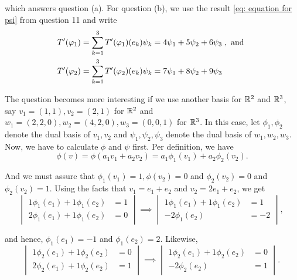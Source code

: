 \begin{xrcs}
\begin{xsol}
    which answers question (a). For question (b), we use the result \eqref{eq: equation for psi} from question 11 and write
    \begin{equation}
      \begin{aligned}
        &\displaystyle T' (\varphi_1) =  \sum_{k=1}^{3} \displaystyle T' (\varphi_1) (e_k) \psi_k = 4 \psi_1 + 5 \psi_2 + 6 \psi_3 \; , \text{ and }  \\
        &\displaystyle T' (\varphi_2) =  \sum_{k=1}^{3} \displaystyle T' (\varphi_2) (e_k) \psi_k = 7 \psi_1 + 8 \psi_2 + 9 \psi_3 \;
      \end{aligned}
    \end{equation}


     The question becomes more interesting if we use another basis for $\mathbb{R}^2$ and $\mathbb{R}^3$, say $v_1 = (1,1), v_2=(2,1)$ for $\mathbb{R}^2$ and $w_1 = (2,2,0), w_2 = (4,2,0), w_3 = (0,0,1)$ for $\mathbb{R}^3$. In this case, let $\phi_1, \phi_2$ denote the dual basis of $v_1, v_2$ and $\psi_1, \psi_2, \psi_3$ denote the dual basis of $w_1, w_2, w_3$. Now, we have to calculate $\phi$ and $\psi$ first. Per definition, we have
    \begin{equation}
      \phi(v) = \phi (a_1 v_1 + a_2 v_2) = a_1 \phi_1 (v_1) + a_2 \phi_2 (v_2).
    \end{equation}

    And we must assure that $\phi_1(v_1)=1, \phi(v_2)=0$ and $\phi_2(v_2)=0$ and $\phi_2(v_2) = 1$. Using the facts that $v_1 = e_1 + e_2$ and $v_2 = 2 e_1 + e_2$, we get
    \begin{equation}
      \left | \;
      \begin{aligned}
        1 \phi_1 (e_1) + 1 \phi_1 (e_2) &= 1 \\
        2 \phi_1 (e_1) + 1 \phi_1 (e_2) &= 0
      \end{aligned} \;
      \right  | \; \implies \;
      \left | \;
        \begin{aligned}
          1 \phi_1 (e_1) + 1 \phi_1 (e_2) &= 1 \\
                         - 2 \phi_1 (e_2) &= -2
        \end{aligned} \;
      \right | \; ,
    \end{equation}

    and hence, $\phi_1(e_1) = -1$ and $\phi_1(e_2) = 2$. Likewise,
    \begin{equation}
    \left | \;
    \begin{aligned}
      1 \phi_2 (e_1) + 1 \phi_2(e_2) &= 0 \\
      2 \phi_2 (e_1) + 1 \phi_2 (e_2) &= 1
    \end{aligned} \;
    \right  | \; \implies \;
    \left | \;
    \begin{aligned}
      1 \phi_2 (e_1) + 1 \phi_2 (e_2) &= 0 \\
      - 2 \phi_2 (e_2) &= 1
    \end{aligned} \;
    \right | \; .
    \end{equation}


\end{xsol}
\end{xrcs}

